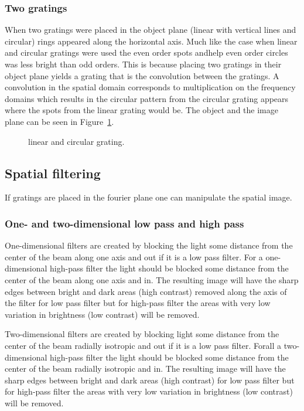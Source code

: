 \documentclass[12pt,a4paper]{article}
\begin{document}
\subsubsection{Two gratings}
When two gratings were placed in the object plane (linear with vertical lines and circular) rings appeared along the horizontal axis. Much like the case when linear and circular gratings were used the even order spots andhelp even order circles was less bright than odd orders. This is because placing two gratings in their object plane yields a grating that is the convolution between the gratings. A convolution in the spatial domain corresponds to multiplication on the frequency domains which results in the circular pattern from the circular grating appears where the spots from the linear grating would be. The object and the image plane can be seen in Figure~\ref{fig:lin_circ_grating}.
\begin{figure}
  \centering
  \noindent\makebox[\textwidth]{\scalebox{0.70}{}}
  \caption{linear and circular grating.}
  \label{fig:lin_circ_grating}
\end{figure}

\subsection{Spatial filtering}
If gratings are placed in the fourier plane one can manipulate the spatial image.

\subsubsection{One- and two-dimensional low pass and high pass}
One-dimensional filters are created by blocking the light some distance from the center of the beam along one axis and out if it is a low pass filter. For a one-dimensional high-pass filter the light should be blocked some distance from the center of the beam along one axis and in.
The resulting image will have the sharp edges between bright and dark areas (high contrast) removed along the axis of the filter for low pass filter but for high-pass filter the areas with very low variation in brightness (low contrast) will be removed.

Two-dimensional filters are created by blocking light some distance from the center of the beam radially isotropic and out if it is a low pass filter. Forall a two-dimensional high-pass filter the light should be blocked some distance from the center of the beam radially isotropic and in.
The resulting image will have the sharp edges between bright and dark areas (high contrast) for low pass filter but for high-pass filter the areas with very low variation in brightness (low contrast) will be removed.
\end{document}
